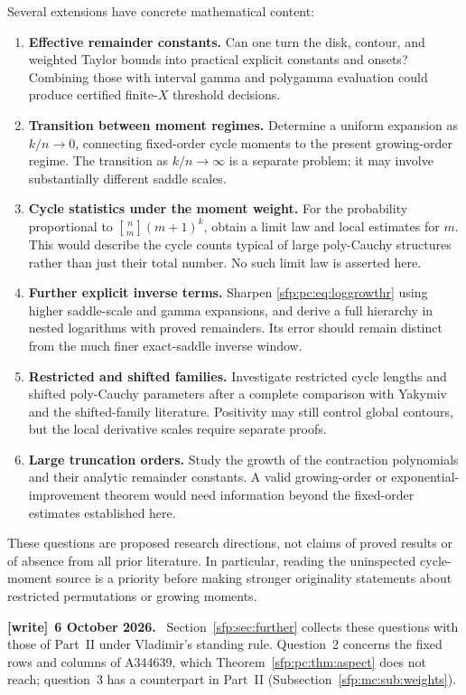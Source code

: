 \documentclass[11pt,letterpaper]{article}
\numberwithin{equation}{section}
\theoremstyle{definition}\newtheorem{definition}[theorem]{Definition}
\theoremstyle{remark}\newtheorem{remark}[theorem]{Remark}
\newcommand{\sone}[2]{\genfrac{[}{]}{0pt}{}{#1}{#2}}
\newenvironment{writenote}[1][]{\par\smallskip\begingroup\small
 \noindent\textbf{[write]}\if\relax\detokenize{#1}\relax\else~\textbf{#1.}\fi\ }%
 {\par\endgroup\smallskip}
\begin{document}
Several extensions have concrete mathematical content:
\begin{enumerate}
\item \textbf{Effective remainder constants.}
      Can one turn the disk, contour, and weighted Taylor bounds
      into practical explicit constants and onsets? Combining
      those with interval gamma and polygamma evaluation could
      produce certified finite-$X$ threshold decisions.
\item \textbf{Transition between moment regimes.}
      Determine a uniform expansion as $k/n\to0$, connecting
      fixed-order cycle moments to the present growing-order
      regime. The transition as $k/n\to\infty$ is a separate
      problem; it may involve substantially different saddle scales.
\item \textbf{Cycle statistics under the moment weight.}
      For the probability proportional to
      $\sone nm(m+1)^k$, obtain a limit law and local estimates
      for $m$. This would describe the cycle counts typical of
      large poly-Cauchy structures rather than just their total
      number. No such limit law is asserted here.
\item \textbf{Further explicit inverse terms.}
      Sharpen \eqref{sfp:pc:eq:loggrowthr} using higher saddle-scale and
      gamma expansions, and derive a full hierarchy in nested
      logarithms with proved remainders. Its error should remain
      distinct from the much finer exact-saddle inverse window.
\item \textbf{Restricted and shifted families.}
      Investigate restricted cycle lengths and shifted poly-Cauchy
      parameters after a complete comparison with Yakymiv and the
      shifted-family literature. Positivity may still control
      global contours, but the local derivative scales require
      separate proofs.
\item \textbf{Large truncation orders.}
      Study the growth of the contraction polynomials and their
      analytic remainder constants. A valid growing-order or
      exponential-improvement theorem would need information beyond
      the fixed-order estimates established here.
\end{enumerate}

These questions are proposed research directions, not claims of
proved results or of absence from all prior literature. In particular,
reading the uninspected cycle-moment source is a priority before
making stronger originality statements about restricted permutations
or growing moments.
\begin{writenote}[6 October 2026]
Section~\ref{sfp:sec:further} collects these questions with those of Part~II under Vladimir's standing rule. Question~2 concerns the fixed rows and columns of A344639, which Theorem~\ref{sfp:pc:thm:aspect} does not reach; question~3 has a counterpart in Part~II (Subsection~\ref{sfp:mc:sub:weights}).
\end{writenote}
\end{document}
